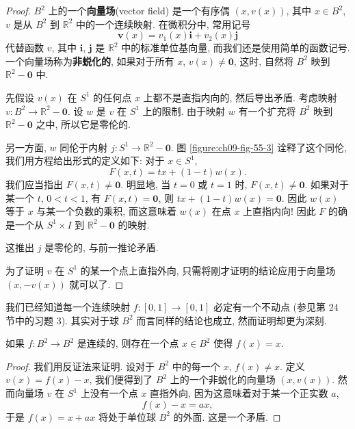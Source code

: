 \begin{proof}
$B^{2}$ 上的一个\textbf{向量场}(vector field) 是一个有序偶 $(x,v(x))$, 其中 $x\in B^{2}$, $v$ 是从 $B^{2}$ 到 $\mathbb{R}^{2}$ 中的一个连续映射. 在微积分中, 常用记号
\[
\boldsymbol{v}(x)=v_{1}(x)\boldsymbol{i}+v_{2}(x)\boldsymbol{j}
\]
代替函数 $v$, 其中 $\boldsymbol{i}$, $\boldsymbol{j}$ 是 $\mathbb{R}^{2}$ 中的标准单位基向量, 而我们还是使用简单的函数记号. 一个向量场称为\textbf{非蜕化的}, 如果对于所有 $x$, $v(x)\neq\boldsymbol{0}$, 这时, 自然将 $B^{2}$ 映到 $\mathbb{R}^{2}-\boldsymbol{0}$ 中.

先假设 $v(x)$ 在 $S^{1}$ 的任何点 $x$ 上都不是直指内向的, 然后导出矛盾. 考虑映射 $v\colon B^{2}\to\mathbb{R}^{2}-\boldsymbol{0}$. 设 $w$ 是 $v$ 在 $S^{1}$ 上的限制. 由于映射 $w$ 有一个扩充将 $B^{2}$ 映到 $\mathbb{R}^{2}-\boldsymbol{0}$ 之中, 所以它是零伦的.

另一方面, $w$ 同伦于内射 $j\colon S^{1}\to\mathbb{R}^{2}-\boldsymbol{0}$. 图 \cref{figure:ch09-fig-55-3} 诠释了这个同伦, 我们用方程给出形式的定义如下: 对于 $x\in S^{1}$,
\[
F(x,t)=tx+(1-t)w(x).
\]
我们应当指出 $F(x,t)\neq\boldsymbol{0}$. 明显地, 当 $t=0$ 或 $t=1$ 时, $F(x,t)\neq\boldsymbol{0}$. 如果对于某一个 $t$, $0<t<1$, 有 $F(x,t)=\boldsymbol{0}$, 则 $tx+(1-t)w(x)=\boldsymbol{0}$. 因此 $w(x)$ 等于 $x$ 与某一个负数的乘积, 而这意味着 $w(x)$ 在点 $x$ 上直指内向! 因此 $F$ 的确是一个从 $S^{1}\times I$ 到 $\mathbb{R}^{2}-\boldsymbol{0}$ 的映射.

这推出 $j$ 是零伦的, 与前一推论矛盾.

为了证明 $v$ 在 $S^{1}$ 的某一个点上直指外向, 只需将刚才证明的结论应用于向量场 $(x,-v(x))$ 就可以了.
\end{proof}


我们已经知道每一个连续映射 $f\colon[0,1]\to[0,1]$ 必定有一个不动点 (参见第 24 节中的习题 3). 其实对于球 $B^{2}$ 而言同样的结论也成立, 然而证明却更为深刻.

\begin{theorem}
\label{theorem:ch09-sec55-55-6}
如果 $f\colon B^{2}\to B^{2}$ 是连续的, 则存在一个点 $x\in B^{2}$ 使得 $f(x)=x$.
\end{theorem}

\begin{proof}
我们用反证法来证明. 设对于 $B^{2}$ 中的每一个 $x$, $f(x)\neq x$. 定义 $v(x)=f(x)-x$, 我们便得到了 $B^{2}$ 上的一个非蜕化的向量场 $(x,v(x))$. 然而向量场 $v$ 在 $S^{1}$ 上没有一个点 $x$ 直指外向, 因为这意味着对于某一个正实数 $a$,
\[
f(x)-x=ax,
\]
于是 $f(x)=x+ax$ 将处于单位球 $B^{2}$ 的外面. 这是一个矛盾.
\end{proof}

